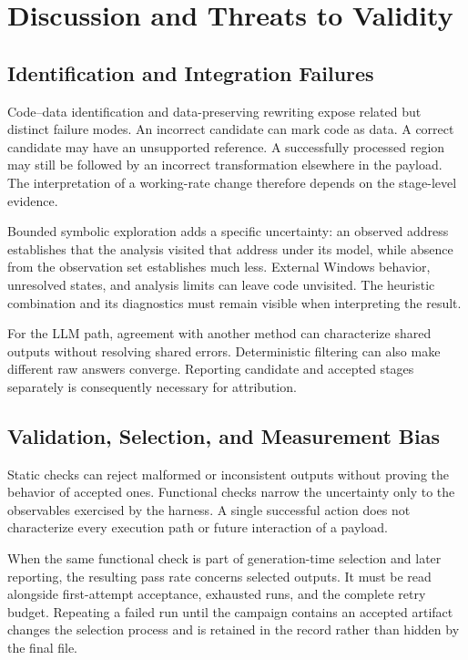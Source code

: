 \section{Discussion and Threats to Validity}\label{sec:discussion}
\subsection{Identification and Integration Failures}
Code--data identification and data-preserving rewriting expose related
but distinct failure modes. An incorrect candidate can mark code as
data. A correct candidate may have an unsupported reference. A
successfully processed region may still be followed by an incorrect
transformation elsewhere in the payload. The interpretation of a
working-rate change therefore depends on the stage-level evidence.

Bounded symbolic exploration adds a specific uncertainty: an observed
address establishes that the analysis visited that address under its
model, while absence from the observation set establishes much less.
External Windows behavior, unresolved states, and analysis limits can
leave code unvisited. The heuristic combination and its diagnostics
must remain visible when interpreting the result.

For the LLM path, agreement with another method can characterize shared
outputs without resolving shared errors. Deterministic filtering can
also make different raw answers converge. Reporting candidate and
accepted stages separately is consequently necessary for attribution.

\subsection{Validation, Selection, and Measurement Bias}
Static checks can reject malformed or inconsistent outputs without
proving the behavior of accepted ones. Functional checks narrow the
uncertainty only to the observables exercised by the harness. A
single successful action does not characterize every execution path
or future interaction of a payload.

When the same functional check is part of generation-time selection
and later reporting, the resulting pass rate concerns selected
outputs. It must be read alongside first-attempt acceptance, exhausted
runs, and the complete retry budget. Repeating a failed run until the
campaign contains an accepted artifact changes the selection process
and is retained in the record rather than hidden by the final file.

